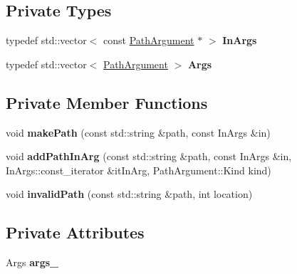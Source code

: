 \subsection*{Private Types}
\begin{DoxyCompactItemize}
\item 
\hypertarget{class_json_1_1_path_ab29d7b2fc896c7d3c5ed4609af3a3f23}{}typedef std\+::vector$<$ const \hyperlink{class_json_1_1_path_argument}{Path\+Argument} $\ast$ $>$ {\bfseries In\+Args}\label{class_json_1_1_path_ab29d7b2fc896c7d3c5ed4609af3a3f23}

\item 
\hypertarget{class_json_1_1_path_a27d96232d034d7a78286468676f9cb3e}{}typedef std\+::vector$<$ \hyperlink{class_json_1_1_path_argument}{Path\+Argument} $>$ {\bfseries Args}\label{class_json_1_1_path_a27d96232d034d7a78286468676f9cb3e}

\end{DoxyCompactItemize}
\subsection*{Private Member Functions}
\begin{DoxyCompactItemize}
\item 
\hypertarget{class_json_1_1_path_a874e5339f8059ebeef049721f8897277}{}void {\bfseries make\+Path} (const std\+::string \&path, const In\+Args \&in)\label{class_json_1_1_path_a874e5339f8059ebeef049721f8897277}

\item 
\hypertarget{class_json_1_1_path_af4d2ab3a6f09b69bab3d3e9fcdf13328}{}void {\bfseries add\+Path\+In\+Arg} (const std\+::string \&path, const In\+Args \&in, In\+Args\+::const\+\_\+iterator \&it\+In\+Arg, Path\+Argument\+::\+Kind kind)\label{class_json_1_1_path_af4d2ab3a6f09b69bab3d3e9fcdf13328}

\item 
\hypertarget{class_json_1_1_path_a3729e6d3682338b2cfad2c10d4746f53}{}void {\bfseries invalid\+Path} (const std\+::string \&path, int location)\label{class_json_1_1_path_a3729e6d3682338b2cfad2c10d4746f53}

\end{DoxyCompactItemize}
\subsection*{Private Attributes}
\begin{DoxyCompactItemize}
\item 
\hypertarget{class_json_1_1_path_af33d0de7ee9f99d3e361bdf504dc2bc7}{}Args {\bfseries args\+\_\+}\label{class_json_1_1_path_af33d0de7ee9f99d3e361bdf504dc2bc7}

\end{DoxyCompactItemize}


